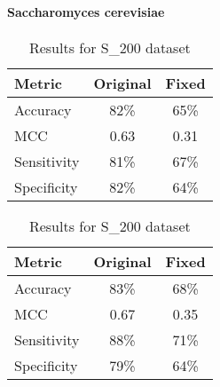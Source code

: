       \paragraph{Saccharomyces cerevisiae}
        \noindent
        \begin{table}[H]
            \centering
            \begin{minipage}{0.45\textwidth}
              \centering
              \begin{tabular}{lcc}
                \toprule
                \textbf{Metric} & \textbf{Original} & \textbf{Fixed} \\
                \midrule
                Accuracy        & 82\%              & 65\%           \\
                MCC             & 0.63              & 0.31           \\
                Sensitivity     & 81\%              & 67\%           \\
                Specificity     & 82\%              & 64\%           \\
                \bottomrule
              \end{tabular}
              \caption{Results for S\_628 dataset}
            \end{minipage}%
            \hfill
            \begin{minipage}{0.45\textwidth}
              \centering
              \begin{tabular}{lcc}
                \toprule
                \textbf{Metric} & \textbf{Original} & \textbf{Fixed} \\
                \midrule
                Accuracy        & 83\%              & 68\%           \\
                MCC             & 0.67              & 0.35           \\
                Sensitivity     & 88\%              & 71\%           \\
                Specificity     & 79\%              & 64\%           \\
                \bottomrule
              \end{tabular}
              \caption{Results for S\_200 dataset}
            \end{minipage}\label{tab:porpoise_pstnpss_sc}
        \end{table}


